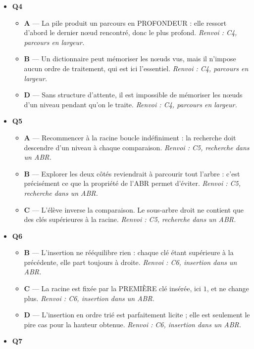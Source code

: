 \begin{itemize}
\begin{itemize}
  \end{itemize}
  \item \textbf{Q4}
  \begin{itemize}
    \item \textbf{A} — La pile produit un parcours en PROFONDEUR : elle ressort d'abord le dernier nœud rencontré, donc le plus profond. \emph{Renvoi : C4, parcours en largeur.}
    \item \textbf{B} — Un dictionnaire peut mémoriser les nœuds vus, mais il n'impose aucun ordre de traitement, qui est ici l'essentiel. \emph{Renvoi : C4, parcours en largeur.}
    \item \textbf{D} — Sans structure d'attente, il est impossible de mémoriser les nœuds d'un niveau pendant qu'on le traite. \emph{Renvoi : C4, parcours en largeur.}
  \end{itemize}
  \item \textbf{Q5}
  \begin{itemize}
    \item \textbf{A} — Recommencer à la racine boucle indéfiniment : la recherche doit descendre d'un niveau à chaque comparaison. \emph{Renvoi : C5, recherche dans un ABR.}
    \item \textbf{B} — Explorer les deux côtés reviendrait à parcourir tout l'arbre : c'est précisément ce que la propriété de l'ABR permet d'éviter. \emph{Renvoi : C5, recherche dans un ABR.}
    \item \textbf{C} — L'élève inverse la comparaison. Le sous-arbre droit ne contient que des clés supérieures à la racine. \emph{Renvoi : C5, recherche dans un ABR.}
  \end{itemize}
  \item \textbf{Q6}
  \begin{itemize}
    \item \textbf{B} — L'insertion ne rééquilibre rien : chaque clé étant supérieure à la précédente, elle part toujours à droite. \emph{Renvoi : C6, insertion dans un ABR.}
    \item \textbf{C} — La racine est fixée par la PREMIÈRE clé insérée, ici $1$, et ne change plus. \emph{Renvoi : C6, insertion dans un ABR.}
    \item \textbf{D} — L'insertion en ordre trié est parfaitement licite ; elle est seulement le pire cas pour la hauteur obtenue. \emph{Renvoi : C6, insertion dans un ABR.}
  \end{itemize}
  \item \textbf{Q7}
  \begin{itemize}

\end{itemize}
\end{itemize}
